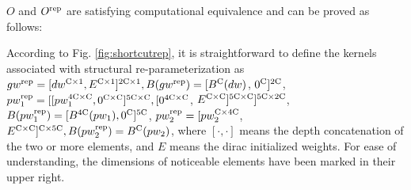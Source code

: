 \documentclass[preprint,12pt]{elsarticle}
\begin{document}
$O$ and $O^{\rm rep}$ are satisfying computational equivalence and can be proved as follows: 

According to Fig. \ref{fig:shortcutrep}, it is straightforward to define the kernels associated with structural re-parameterization as $gw^{\rm rep} = [dw^{{\rm C} \times 1}, E^{{\rm C} \times 1}]^{2{\rm C} \times 1}, B(gw^{\rm rep}) = [B^{{\rm C}}(dw)$, $0^{{\rm C}}]^{2{\rm C}}$, 
$pw_1^{\rm rep} = [[pw_1^{4{\rm C} \times {\rm C}}, 0^{{\rm C} \times {\rm C}}]^{5{\rm C} \times {\rm C}}, [0^{4{\rm C} \times {\rm C}}$, $E^{{\rm C} \times {\rm C}}]^{5{\rm C} \times {\rm C}}]^{5{\rm C} \times 2{\rm C}}$, 
$B(pw_1^{\rm rep}) = [B^{4{\rm C}}(pw_1), 0^{{\rm C}}]^{5{\rm C}}$,
$pw_2^{\rm rep}=[pw_2^{{\rm C} \times 4{\rm C}}$, $E^{{\rm C} \times {\rm C}}]^{{\rm C} \times 5{\rm C}}, B(pw_2^{\rm rep})=B^{\rm C}(pw_2)$, where $[\cdot, \cdot]$ means the depth concatenation of the two or more elements, and $E$ means the dirac initialized weights. For ease of understanding, the dimensions of noticeable elements have been marked in their upper right.
\end{document}
